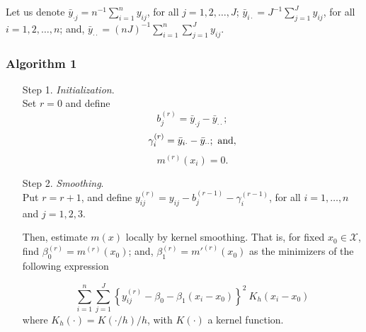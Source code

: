\documentclass[sn-mathphys]{sn-jnl}%
\theoremstyle{thmstyleone}%
\theoremstyle{thmstyletwo}%
\theoremstyle{thmstylethree}%
\begin{document}
Let us denote $\bar{y}_{\cdot j} =n^{-1}\sum_{i=1}^n y_{ij}$, for all $j=1, 2,\ldots, J$; $\bar{y}_{ i \cdot} =J^{-1}\sum_{j=1}^J y_{ij}$, for all $i=1,2,\ldots, n$; and, $\bar{y}_{\cdot \cdot} =(n  J)^{-1}\sum_{i=1}^n \sum_{j=1}^J y_{ij}$.\

\subsubsection*{ Algorithm 1}
\begin{enumerate}
\item[Step 1.] \textit{Initialization}. \\
 \noindent Set $r=0$ and define
$$b_j^{(r)}=\bar{y}_{\cdot j}-\bar{y}_{\cdot \cdot};$$
$$\gamma_i^{(r)}=\bar{y}_{i \cdot}-\bar{y}_{\cdot \cdot};\ {\rm and}, $$
$$m^{(r)}(x_i)=0.$$ 

\item[Step 2.]  \textit{Smoothing}.\\
\noindent Put $r=r+1$, and define $y_{ij}^{(r)}=y_{ij}-b_j^{(r-1)}-\gamma_i^{(r-1)}$, for all $i=1, \ldots, n$ and $j=1,2,3$.

Then, estimate $m(x)$ locally by kernel smoothing. That is, for fixed $x_0 \in \mathcal{X}$, find ${\beta}^{(r)}_0={m}^{(r)}(x_0)$; and, ${\beta}^{(r)}_1={m'}^{(r)}(x_0)$ as the minimizers of the following expression

\begin{equation*}
\sum_{i=1}^n\sum_{j=1}^J\left\{y_{ij}^{(r)}-\beta_0-\beta_1(x_i-x_0)\right\}^2 \ K_h\left(x_i-x_0\right)%
\end{equation*} 
where $K_h(\cdot)=K(\cdot/h)/h$, with $K(\cdot)$ a kernel function. \



\end{enumerate}
\end{document}
